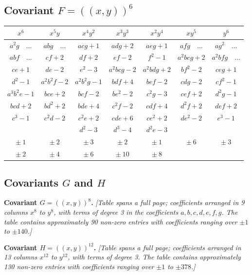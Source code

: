 \documentclass[11pt,a4paper]{book}
\begin{document}
\newpage

\subsection*{Covariant $F = (\!\!(x,y)\!\!)^{6}$}

\begin{center}
\small
\begin{tabular}{|c|c|c|c|c|c|c|}
\hline
$x^{6}$ & $x^{5}y$ & $x^{4}y^{2}$ & $x^{3}y^{3}$ & $x^{2}y^{4}$ & $xy^{5}$ & $y^{6}$ \\
\hline
$a^{2}g\quad\dots$ & $abg\quad\dots$ & $acg+1$ & $adg+2$ & $aeg+1$ & $afg\quad\dots$ & $ag^{2}\quad\dots$ \\
$abf\quad\dots$ & $cf+2$ & $df+2$ & $ef-2$ & $f^{2}-1$ & $a^{2}beg+2$ & $a^{2}bfg\quad\dots$ \\
$ce+1$ & $de-2$ & $e^{2}-3$ & $a^{2}bcg-2$ & $a^{2}bdg+2$ & $bf^{2}-2$ & $ceg+1$ \\
$d^{2}-1$ & $a^{2}b^{2}f-2$ & $a^{2}b^{2}g-1$ & $bdf+4$ & $bef-2$ & $cdg-2$ & $cf^{2}-1$ \\
$a^{3}b^{2}e-1$ & $bce+2$ & $bcf-2$ & $be^{2}-2$ & $c^{2}g-3$ & $cef+2$ & $d^{2}g-1$ \\
$bcd+2$ & $bd^{2}+2$ & $bde+4$ & $c^{2}f-2$ & $cdf+4$ & $d^{2}f+2$ & $def+2$ \\
$c^{3}-1$ & $c^{2}d-2$ & $c^{2}e+2$ & $cde+6$ & $ce^{2}+2$ & $de^{2}-2$ & $e^{3}-1$ \\
 &  & $d^{2}-3$ & $d^{3}-4$ & $d^{2}e-3$ &  &  \\
\hline
$\pm\ 1$ & $\pm\ 2$ & $\pm\ 3$ & $\pm\ 2$ & $\pm\ 1$ & $\pm\ 6$ & $\pm\ 3$ \\
$\pm\ 2$ & $\pm\ 4$ & $\pm\ 6$ & $\pm\ 10$ & $\pm\ 8$ &  &  \\
\hline
\end{tabular}
\end{center}

\newpage

\subsection*{Covariants $G$ and $H$}

\textbf{Covariant $G = (\!\!(x,y)\!\!)^{8}$.}
\textit{[Table spans a full page; coefficients arranged in 9 columns $x^{8}$ to $y^{8}$, with terms of degree 3 in the coefficients $a,b,c,d,e,f,g$. The table contains approximately 90 non-zero entries with coefficients ranging over $\pm1$ to $\pm140$.]}

\textbf{Covariant $H = (\!\!(x,y)\!\!)^{12}$.}
\textit{[Table spans a full page; coefficients arranged in 13 columns $x^{12}$ to $y^{12}$, with terms of degree 3. The table contains approximately 130 non-zero entries with coefficients ranging over $\pm1$ to $\pm378$.]}
\end{document}
